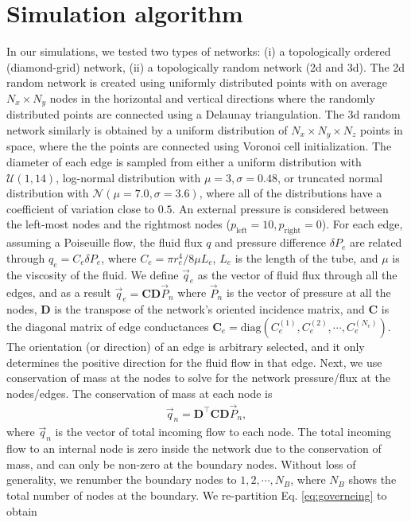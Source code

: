 \documentclass[%
 amsmath,amssymb,
prstper,
]{revtex4-2}
\begin{document}
\section{Simulation algorithm}
%
In our simulations, we tested two types of networks: (i) a topologically ordered (diamond-grid) network, (ii) a topologically random network (2d and 3d). 
The 2d random network is created using uniformly distributed points with on average $N_x\times N_y$ nodes in the horizontal and vertical directions where the randomly distributed points are connected using a Delaunay triangulation. The 3d random network similarly is obtained by a uniform distribution of $N_x\times N_y \times N_z$ points in space, where the the points are connected using Voronoi cell initialization. The diameter of each edge is sampled from either a uniform distribution with $\mathcal{U}(1,14)$, log-normal distribution with $\mu=3,\sigma=0.48$, or truncated normal distribution with $\mathcal{N}(\mu=7.0,\sigma=3.6)$, where all of the distributions have a coefficient of variation close to $0.5$.  An external pressure is considered between the left-most nodes and the rightmost nodes ($p_\text{left}=10,p_\text{right}=0$). For each edge, assuming a Poiseuille flow, the fluid flux  $q$ and pressure difference $\delta P_e$ are related through $q_e = C_e \delta P_e$, where $C_e = \pi r^4_e/8\mu L_e$,  $L_e$ is the length of the tube, and $\mu$ is the viscosity of the fluid. We define $\vec{q}_e$ as the vector of fluid flux through all the edges, and as a result $\vec{q}_e = \mathbf{C} \mathbf{D}\vec{P}_n$ where $\vec{P}_n$ is the vector of pressure at all the nodes, $\mathbf{D}$ is the transpose of the network's oriented incidence matrix, and $\mathbf{C}$ is the diagonal matrix of edge conductances $\mathbf{C}_e = \text{diag} \left( C^{(1)}_e, C^{(2)}_e, \cdots,C^{(N_e)}_e\right)$. The orientation (or direction) of an edge is arbitrary selected, and it only determines the positive direction for the fluid flow in that edge. Next, we  use conservation of mass at the nodes to solve for the network pressure/flux at the nodes/edges. The conservation of mass at each node is 
%
\begin{align}
    \vec{q}_n = \mathbf{D}^\top \mathbf{C} \mathbf{D} \vec{P}_n, \label{eq:governeing}
\end{align}
%
where $\vec{q}_n$ is the vector of total incoming flow to each node. The total incoming flow to an internal node is zero inside the network due to the conservation of mass, and can only be non-zero at the boundary nodes. Without loss of generality, we renumber the boundary nodes to $1,2,\cdots, N_{B}$, where $N_B$ shows the total number of nodes at the boundary. We re-partition Eq. \eqref{eq:governeing} to obtain 
\end{document}
